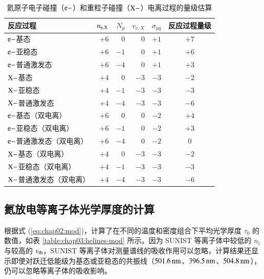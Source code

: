 \begin{table}%
\caption{氦原子电子碰撞（${\rm e-}$）和重粒子碰撞（${\rm X-}$）电离过程的量级估算}
\label{table:chap03:ion-process-gusuan}
\begin{center}
\begin{tabular}{lrrrrc}\toprule[1.5pt]
反应过程 & $n_{\rm e,X}$ & $N_{p}$ & $v_{e,X}$ & $\sigma_{pq}$ & 反应过程量级\\
\midrule[1pt]
${\rm e-}$基态       & $+6$ & $0$  & $0$  & $+1$ & $+7$ \\
${\rm e-}$亚稳态     & $+6$ & $-1$ & $0$  & $+1$ & $+6$ \\
${\rm e-}$普通激发态 & $+6$ & $-4$ & $0$  & $+1$ & $+3$ \\
${\rm X-}$基态       & $+4$ & $0$  & $-3$ & $-3$ & $-2$ \\
${\rm X-}$亚稳态     & $+4$ & $-1$ & $-3$ & $-3$ & $-3$ \\
${\rm X-}$普通激发态 & $+4$ & $-4$ & $-3$ & $-3$ & $-6$ \\
${\rm e-}$基态（双电离）       & $+6$ & $0$  & $0$  & $-2$  & $+4$ \\
${\rm e-}$亚稳态（双电离）     & $+6$ & $-1$ & $0$  & $-2$  & $+3$ \\
${\rm e-}$普通激发态（双电离） & $+6$ & $-4$ & $0$  & $-2$  & \hspace{0.8em}$0$ \\
${\rm X-}$基态（双电离）       & $+4$ & $0$  & $-3$ & $-3$ & $-2$ \\
${\rm X-}$亚稳态（双电离）     & $+4$ & $-1$ & $-3$ & $-3$ & $-3$ \\
${\rm X-}$普通激发态（双电离） & $+4$ & $-4$ & $-3$ & $-3$ & $-6$ \\
\bottomrule[1.5pt]
\end{tabular}
\end{center}
\end{table}

\subsection{氦放电等离子体光学厚度的计算}

根据式 (\ref{eq:chap02:mod})，计算了在不同的温度和密度组合下平均光学厚度 $\tau_0$ 的数值，如表 \ref{table:chap03:helines-mod} 所示。因为 SUNIST 等离子体中较低的 $n_i$ 与较高的 $v_{\rm th}$，SUNIST 等离子体对测量谱线的吸收作用可以忽略，计算结果还显示即使对跃迁低能级为基态或亚稳态的共振线（$501.6\,{\rm nm}$、$396.5\,{\rm nm}$、$504.8\,{\rm nm}$），仍可以忽略等离子体的吸收影响。

